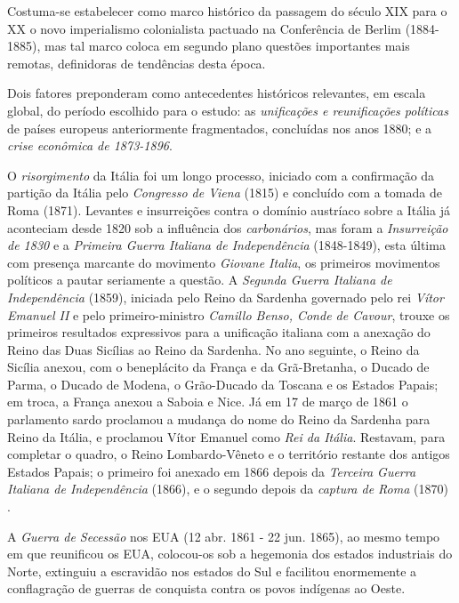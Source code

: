 Costuma-se estabelecer como marco histórico da passagem do século XIX para o XX o novo imperialismo colonialista pactuado na Conferência de Berlim (1884-1885), mas tal marco coloca em segundo plano questões importantes mais remotas, definidoras de tendências desta época.  

Dois fatores preponderam como antecedentes históricos relevantes, em escala global, do período escolhido para o estudo: as \textit{unificações e reunificações políticas} de países europeus anteriormente fragmentados, concluídas nos anos 1880; e a \textit{crise econômica de 1873-1896}.

O \textit{risorgimento} da Itália foi um longo processo, iniciado com a confirmação da partição da Itália pelo \textit{Congresso de Viena} (1815) e concluído com a tomada de Roma (1871). Levantes e insurreições contra o domínio austríaco sobre a Itália já aconteciam desde 1820 sob a influência dos \textit{carbonários}, mas foram a \textit{Insurreição de 1830} e a \textit{Primeira Guerra Italiana de Independência} (1848-1849), esta última com presença marcante do movimento \textit{Giovane Italia}, os primeiros movimentos políticos a pautar seriamente a questão. A \textit{Segunda Guerra Italiana de Independência} (1859), iniciada pelo Reino da Sardenha governado pelo rei \textit{Vítor Emanuel II} e pelo primeiro-ministro \textit{Camillo Benso, Conde de Cavour}, trouxe os primeiros resultados expressivos para a unificação italiana com a anexação do Reino das Duas Sicílias ao Reino da Sardenha. No ano seguinte, o Reino da Sicília anexou, com o beneplácito da França e da Grã-Bretanha, o Ducado de Parma, o Ducado de Modena, o Grão-Ducado da Toscana e os Estados Papais; em troca, a França anexou a Saboia e Nice. Já em 17 de março de 1861 o parlamento sardo proclamou a mudança do nome do Reino da Sardenha para Reino da Itália, e proclamou Vítor Emanuel como \textit{Rei da Itália}. Restavam, para completar o quadro, o Reino Lombardo-Vêneto e o território restante dos antigos Estados Papais; o primeiro foi anexado em 1866 depois da \textit{Terceira Guerra Italiana de Independência} (1866), e o segundo depois da \textit{captura de Roma} (1870) \cite{hobsbawm_capital_1977}.

A \textit{Guerra de Secessão} nos EUA (12 abr. 1861 - 22 jun. 1865), ao mesmo tempo em que reunificou os EUA, colocou-os sob a hegemonia dos estados industriais do Norte, extinguiu a escravidão nos estados do Sul e facilitou enormemente a conflagração de guerras de conquista contra os povos indígenas ao Oeste. 

